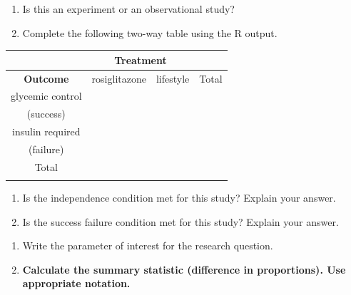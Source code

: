 \documentclass[
]{report}
\begin{document}
\begin{enumerate}
\def\labelenumi{\arabic{enumi}.}
\item
  Is this an experiment or an observational study?
  \vspace{0.2in}
\item
  Complete the following two-way table using the R output.
\end{enumerate}

\begin{center}
\begin{tabular}{|c|c|c|c|}\hline
 & \multicolumn{2}{|c|}{\textbf{Treatment}} & \\ \hline
\textbf{Outcome} & \hspace{0.35in} rosiglitazone \hspace{0.35in} & \hspace{0.35in} lifestyle \hspace{0.35in} & \hspace{0.35in} Total \hspace{0.35in} \\ \hline
 glycemic control & & & \\ 
 (success) & & & \\ \hline
 insulin required & & & \\ 
 (failure) & & & \\ \hline
 Total & & &  \\ 
 & & & \\ \hline  
\end{tabular}
\end{center}

\begin{enumerate}
\def\labelenumi{\arabic{enumi}.}
\setcounter{enumi}{2}
\item
  Is the independence condition met for this study? Explain your answer.
  \vspace{0.6in}
\item
  Is the success failure condition met for this study? Explain your answer.
\end{enumerate}

\vspace{0.6in}

\begin{enumerate}
\def\labelenumi{\arabic{enumi}.}
\setcounter{enumi}{4}
\item
  Write the parameter of interest for the research question.
  \vspace{0.6in}
\item
  \textbf{Calculate the summary statistic (difference in proportions). Use appropriate notation.}
  \vspace{0.3in}
\end{enumerate}
\end{document}
